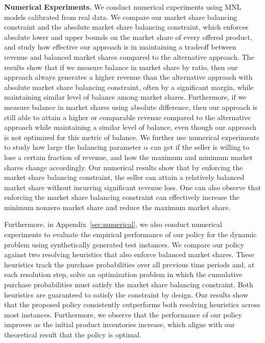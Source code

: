 \documentclass[mnsc,non-blindrev]{informs3}
\theoremstyle{definition}
\begin{document}
\vspace{2mm}
\noindent\textbf{Numerical Experiments.} {  We conduct numerical experiments using MNL models calibrated from real data. We compare our market share balancing constraint and the absolute market share balancing constraint, which enforces absolute lower and upper bounds on the market share of every offered product, and study how effective our approach is in maintaining a tradeoff between revenue and balanced market shares compared to the alternative approach. The results show that if we measure balance in market share by ratio, then our approach always generates a higher revenue than the alternative approach with absolute market share balancing constraint, often by a significant margin, while maintaining similar level of balance among market shares. Furthermore, if we measure balance in market shares using absolute difference, then our approach is still able to attain a higher or comparable revenue compared to the alternative approach while maintaining a similar level of balance, even though our approach is not optimized for this metric of balance. We further use numerical experiments to study how large the balancing parameter $\alpha$ can get if the seller is willing to lose a certain fraction of revenue, and how the maximum and minimum market shares change accordingly. Our numerical results show that by enforcing the market share balancing constraint, the seller can attain a relatively balanced market share without incurring significant revenue loss. One can also observe that enforcing the market share balancing constraint can effectively increase the minimum nonzero market share and reduce the maximum market share.}

{  Furthermore, in Appendix~\ref{sec:numerical},} we also conduct numerical experiments to evaluate the empirical performance of our policy for the dynamic problem using synthetically generated test instances. We compare our policy against two resolving heuristics that also enforce balanced market shares. These heuristics track the purchase probabilities over all previous time periods and, at each resolution step, solve an optimization problem in which the cumulative purchase probabilities must satisfy the market share balancing constraint. Both heuristics are guaranteed to satisfy the constraint by design.
Our results show that the proposed policy consistently outperforms both resolving heuristics across most instances. Furthermore, we observe that the performance of our policy improves as the initial product inventories increase, which aligns with our theoretical result that the policy is optimal.
\end{document}

